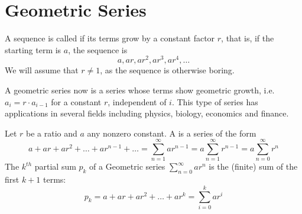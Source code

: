 \section{Geometric Series}

A sequence is called  if its terms grow by a constant
factor $r$, that is, if the starting term
is $a$, the sequence is 
\[
a, ar, ar^2, ar^3, ar^4,\ldots
\]
We will assume that $r\not=1$, as the sequence is otherwise boring.

%
%

A geometric series now is a series whose terms show geometric growth, i.e.
$a_i=r\cdot a_{i-1}$ for a constant $r$, independent of $i$.
This type of series has applications in several fields
including physics, biology, economics and finance.

\begin{defn}
Let $r$ be a ratio and $a$ any nonzero constant. A 
is a series of the form
\[
a+ ar + ar^{2}+ \ldots + ar^{n-1}+ \ldots = \sum_{n=1}^{\infty}
ar^{n-1} =a\sum_{n=1}^\infty r^{n-1}=a\sum_{n=0}^\infty r^n
\]
The $k^{th}$ partial sum $p_{k}$ of a Geometric series
$\displaystyle{\sum_{n=0}^{\infty} ar^{n}}$ is the (finite) sum of
the first $k+1$ terms:
\[
p_{k} = a + ar + ar^{2} + \ldots + ar^k =
\sum_{i=0}^k ar^{i}
\]
\end{defn}


